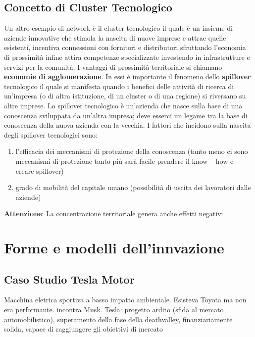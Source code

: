 \documentclass{article}
\begin{document}
\subsection{Concetto di Cluster Tecnologico}
Un altro esempio di network è il cluster tecnologico il quale è un insieme di aziende innovative che stimola la nascita di nuove imprese e attrae quelle esistenti, incentiva connessioni con fornitori e distributori sfruttando l'economia di prossimità infine attira competenze specializzate investendo in infrastrutture e servizi per la comunità.
I vantaggi di prossimità territoriale si chiamano \textbf{economie di agglomerazione}.
In essi è importante il fenomeno dello \textbf{spillover} tecnologico il quale si manifesta quando i benefici delle attività di
ricerca di un’impresa (o di altra istituzione, di un cluster o di una regione) si riversano su altre
imprese. Lo spillover tecnologico è un’azienda che nasce sulla base di una conoscenza sviluppata
da un’altra impresa; deve esserci un legame tra la base di conoscenza della nuova azienda con la
vecchia. I fattori che incidono sulla nascita degli spillover tecnologici sono:
\begin{enumerate}
	\item l’efficacia dei meccanismi di protezione della conoscenza (tanto meno ci sono meccanismi
	di protezione tanto più sarà facile prendere il know – how e creare spillover)
	\item grado di mobilità del capitale umano (possibilità di uscita dei lavoratori dalle aziende)
\end{enumerate}

\textbf{Attenzione}: La concentrazione territoriale genera anche effetti negativi 

\section{Forme e modelli dell'innvazione}

\subsection{Caso Studio Tesla Motor}
Macchina eletrica sportiva a basso impatto ambientale. Esisteva Toyota ma non era performante. incontra Musk. 
Tesla: progetto ardito (sfida al mercato automobilistico), superamento della fase della deathvalley, finanziariamente solida, capace di raggiungere gli obiettivi di mercato 
\end{document}
